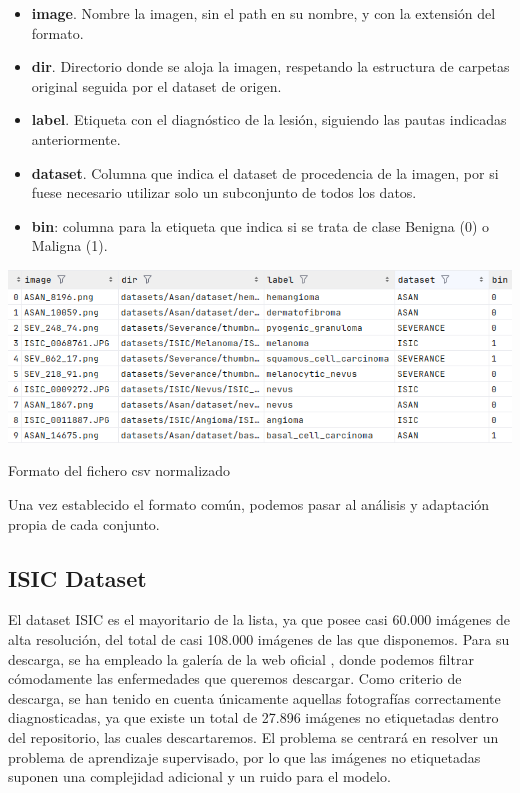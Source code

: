 \begin{itemize}
	\item \textbf{image}. Nombre la imagen, sin el path en su nombre, y con la extensión del formato.
	\item \textbf{dir}. Directorio donde se aloja la imagen, respetando la estructura de carpetas original seguida por el dataset de origen.
	\item \textbf{label}. Etiqueta con el diagnóstico de la lesión, siguiendo las pautas indicadas anteriormente.
	\item \textbf{dataset}. Columna que indica el dataset de procedencia de la imagen, por si fuese necesario utilizar solo un subconjunto de todos los datos.
	\item \textbf{bin}: columna para la etiqueta que indica si se trata de clase Benigna (0) o Maligna (1).
\end{itemize}

\begin{table}[H]
	\centering
	\includegraphics[scale = 0.45]{imagenes/formatocsv.png}
	\caption{Formato del fichero csv normalizado}
	\label {formatocsv}
\end{table}

Una vez establecido el formato común, podemos pasar al análisis y adaptación propia de cada conjunto.

\subsection{ISIC Dataset}

El dataset ISIC es el mayoritario de la lista, ya que posee casi 60.000 imágenes de alta resolución, del total de casi 108.000 imágenes de las que disponemos. Para su descarga, se ha empleado la galería de la web oficial \cite{isicarchive}, donde podemos filtrar cómodamente las enfermedades que queremos descargar. Como criterio de descarga, se han tenido en cuenta únicamente aquellas fotografías correctamente diagnosticadas, ya que existe un total de 27.896 imágenes no etiquetadas dentro del repositorio, las cuales descartaremos. El problema se centrará en resolver un problema de aprendizaje supervisado, por lo que las imágenes no etiquetadas suponen una complejidad adicional y un ruido para el modelo.

